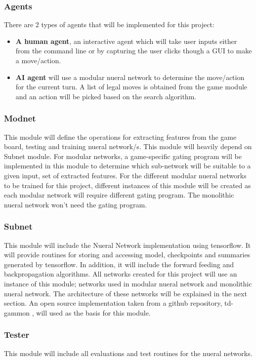 \documentclass[12pt,a4paper]{article}
\begin{document}
\subsubsection{Agents}
There are 2 types of agents that will be implemented for this project: 
\begin{itemize}
    \item \textbf{A human agent}, an interactive agent which will take user inputs either from the command line or by capturing the user clicks though a GUI to make a move/action.
    \item \textbf{AI agent} will use a modular nueral network to determine the move/action for the current turn. A list of legal moves is obtained from the game module and an action will be picked based on the search algorithm.
\end{itemize}

\subsubsection{Modnet}
This module will define the operations for extracting features from the game board, testing and training nueral network/s. This module will heavily depend on Subnet module. For modular networks, a game-specific gating program will be implemented in this module to determine which sub-network will be suitable to a given input, set of extracted features. For the different modular nueral networks to be trained for this project, different instances of this module will be created as each modular network will require different gating program. The monolithic nueral network won't need the gating program.

\subsubsection{Subnet}
This module will include the Nueral Network implementation using tensorflow. It will provide routines for storing and accessing model, checkpoints and summaries generated by tensorflow. In addition, it will include the forward feeding and backpropagation algorithms. All networks created for this project will use an instance of this module; networks used in modular nueral network and monolithic nueral network. The architecture of these networks will be explained in the next section. An open source implementation taken from a github repository, td-gammon \cite{fomorians}, will used as the basis for this module. 

\subsubsection{Tester}
This module will include all evaluations and test routines for the nueral networks. 
\end{document}

